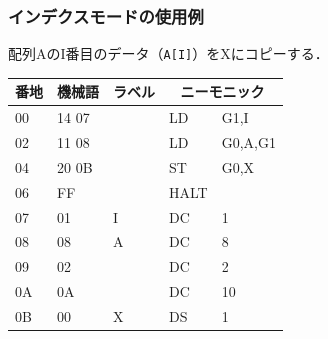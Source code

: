\documentclass{beamer}                 %
\begin{document}
\begin{frame}
  \frametitle{インデクスモードの使用例}
  配列AのI番目のデータ（\texttt{A[I]}）をXにコピーする．
  \vfill
  \begin{minipage}[]{0.58\columnwidth}
  {\small\ttfamily\begin{center}
    \begin{tabular}{|l|l|l|l l|} \hline
      {\footnotesize 番地} & {\footnotesize 機械語} &
      {\footnotesize ラベル} & \multicolumn{2}{|c|}{ニーモニック} \\
      \hline
      00 & 14 07 &   & LD   & G1,I          \\
      02 & 11 08 &   & LD   & G0,A,G1       \\
      04 & 20 0B &   & ST   & G0,X          \\
      06 & FF    &   & HALT &               \\
      07 & 01    & I & DC   & 1             \\
      08 & 08    & A & DC   & 8             \\
      09 & 02    &   & DC   & 2             \\
      0A & 0A    &   & DC   & 10            \\
      0B & 00    & X & DS   & 1             \\
      \hline
    \end{tabular}
  \end{center}}
  \end{minipage}
  \begin{minipage}[b]{0.38\columnwidth}
    \vspace{1.3cm}
  \end{minipage}
  \vfill
\end{frame}
\end{document}
